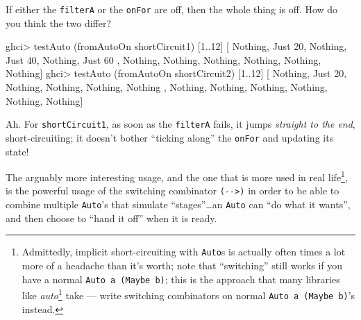 \documentclass[]{article}
\newenvironment{Shaded}{}{}
\newcommand{\DataTypeTok}[1]{\textcolor[rgb]{0.56,0.13,0.00}{{#1}}}
\newcommand{\DecValTok}[1]{\textcolor[rgb]{0.25,0.63,0.44}{{#1}}}
\newcommand{\FunctionTok}[1]{\textcolor[rgb]{0.02,0.16,0.49}{{#1}}}
\newcommand{\NormalTok}[1]{{#1}}
\renewcommand{\href}[2]{#2\footnote{\url{#1}}}
\begin{document}
If either the \texttt{filterA} or the \texttt{onFor} are off, then the
whole thing is off. How do you think the two differ?

\begin{Shaded}
\begin{Highlighting}[]
\NormalTok{ghci}\FunctionTok{>} \NormalTok{testAuto (fromAutoOn shortCircuit1) [}\DecValTok{1}\FunctionTok{..}\DecValTok{12}\NormalTok{]}
\NormalTok{[ }\DataTypeTok{Nothing}\NormalTok{, }\DataTypeTok{Just} \DecValTok{20}\NormalTok{, }\DataTypeTok{Nothing}\NormalTok{, }\DataTypeTok{Just} \DecValTok{40}\NormalTok{, }\DataTypeTok{Nothing}\NormalTok{, }\DataTypeTok{Just} \DecValTok{60}
\NormalTok{, }\DataTypeTok{Nothing}\NormalTok{, }\DataTypeTok{Nothing}\NormalTok{, }\DataTypeTok{Nothing}\NormalTok{, }\DataTypeTok{Nothing}\NormalTok{, }\DataTypeTok{Nothing}\NormalTok{, }\DataTypeTok{Nothing}\NormalTok{]}
\NormalTok{ghci}\FunctionTok{>} \NormalTok{testAuto (fromAutoOn shortCircuit2) [}\DecValTok{1}\FunctionTok{..}\DecValTok{12}\NormalTok{]}
\NormalTok{[ }\DataTypeTok{Nothing}\NormalTok{, }\DataTypeTok{Just} \DecValTok{20}\NormalTok{, }\DataTypeTok{Nothing}\NormalTok{, }\DataTypeTok{Nothing}\NormalTok{, }\DataTypeTok{Nothing}\NormalTok{, }\DataTypeTok{Nothing}
\NormalTok{, }\DataTypeTok{Nothing}\NormalTok{, }\DataTypeTok{Nothing}\NormalTok{, }\DataTypeTok{Nothing}\NormalTok{, }\DataTypeTok{Nothing}\NormalTok{, }\DataTypeTok{Nothing}\NormalTok{, }\DataTypeTok{Nothing}\NormalTok{]}
\end{Highlighting}
\end{Shaded}

Ah. For \texttt{shortCircuit1}, as soon as the \texttt{filterA} fails,
it jumps \emph{straight to the end}, short-circuiting; it doesn't bother
``ticking along'' the \texttt{onFor} and updating its state!

The arguably more interesting usage, and the one that is more used in
real life\footnote{Admittedly, implicit short-circuiting with
  \texttt{Auto}s is actually often times a lot more of a headache than
  it's worth; note that ``switching'' still works if you have a normal
  \texttt{Auto\ a\ (Maybe\ b)}; this is the approach that many libraries
  like \href{https://github.com/mstksg/auto.}{\emph{auto}} take ---
  write switching combinators on normal \texttt{Auto\ a\ (Maybe\ b)}'s
  instead.}, is the powerful usage of the switching combinator
\texttt{(-\/-\textgreater{})} in order to be able to combine multiple
\texttt{Auto}'s that simulate ``stages''\ldots{}an \texttt{Auto} can
``do what it wants'', and then choose to ``hand it off'' when it is
ready.
\end{document}
